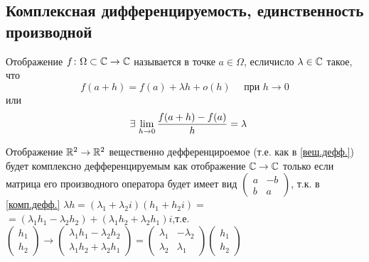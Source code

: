 \subsection{Комплексная дифференцируемость, единственность производной}

\begin{opr}\label{комп.дефф.} %
	Отображение $f \colon \Omega \subset \mathbb{C} \to \mathbb{C}$ \quad называется 
	\vspace{5pt plus 1pt minus 1pt}
	  в точке $a \in \Omega$, если\E число $\lambda \in \mathbb{C}$ такое, что 
	\[f(a + h) = f(a) + \lambda h + o(h) \quad \text{ при } h \to 0\]
	или 
	\[\E \lim_{h \to 0} \frac{f(a + h) - f(a)}{h} = \lambda\]
\end{opr} %

\begin{zam}[https://www.youtube.com/live/4EMkUsyQQec?si=5ErXIDLgaXeqGr0c&t=8050]
	Отображение $\mathbb R^2 \to \mathbb R^2$ вещественно дефференцироемое (т.е. как в \ref{вещ.дефф.}) будет комплексно дефференцируемым как отображение $\mathbb{C} \to \mathbb{C}$ только если матрица его производного оператора будет имеет вид $
	\begin{pmatrix}
		a & -b \\
		b & a
	\end{pmatrix}$, т.к. в \ref{комп.дефф.} 
	$\lambda h = (\lambda_1 + \lambda_2i)(h_1 + h_2i)={}$ 
	\vspace{5pt plus 1pt minus 1pt}\linebreak
	${}= (\lambda_1h_1 - \lambda_2h_2) + (\lambda_1h_2 + \lambda_2h_1)i$,\quad т.е. $
	\begin{pmatrix}
		h_1 \\
		h_2
	\end{pmatrix} \to
	\begin{pmatrix}
		\lambda_1h_1 - \lambda_2h_2\\
		\lambda_1h_2 + \lambda_2h_1
	\end{pmatrix} = 
	\begin{pmatrix}
		\lambda_1 & -\lambda_2 \\
		\lambda_2 & \lambda_1
	\end{pmatrix}
	\begin{pmatrix}
		h_1 \\
		h_2
	\end{pmatrix}$
\end{zam} %

